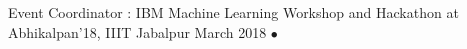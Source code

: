 \begin{cvhonors}
  \cvhonor
    {\small Event Coordinator : }
    {\small IBM Machine Learning Workshop and Hackathon at Abhikalpan'18, IIIT Jabalpur}
    {\small March 2018}
    {$\bullet$}
\end{cvhonors}
